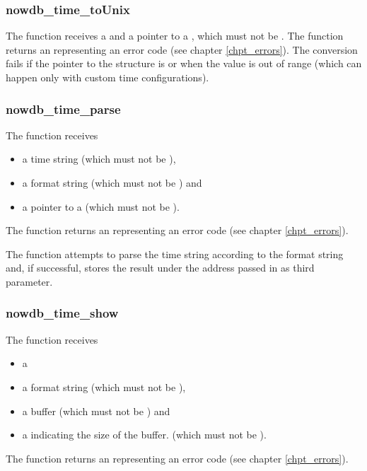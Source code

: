 \subsubsection{nowdb\_time\_toUnix}
The function receives a  
and a pointer to a  ,
which must not be .
The function returns an  representing
an error code (see chapter \ref{chpt_errors}).
The conversion fails if the pointer to the 
structure is  or when the
 value is out of range
(which can happen only with custom time configurations).

\subsubsection{nowdb\_time\_parse}
The function receives
\begin{itemize}
\item a time string (which must not be ),
\item a format string (which must not be ) and
\item a pointer to a 
(which must not be ).
\end{itemize}

The function returns an  representing
an error code (see chapter \ref{chpt_errors}).

The function attempts to parse the time string
according to the format string and, if successful,
stores the result under the address passed in as third parameter.

\subsubsection{nowdb\_time\_show}
The function receives
\begin{itemize}
\item a 
\item a format string (which must not be ),
\item a  buffer (which must not be ) and
\item a  indicating the size of the buffer.
(which must not be ).
\end{itemize}

The function returns an  representing
an error code (see chapter \ref{chpt_errors}).

